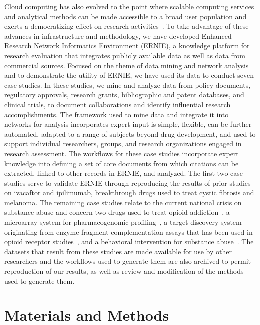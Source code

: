 \documentclass[review]{elsarticle}
\begin{document}
Cloud computing has also evolved to the point where scalable computing services and analytical methods can be made accessible to a broad user population and exerts a democratizing effect on research activities~\cite{Barga2011}. To take advantage of these advances in infrastructure and methodology, we have developed Enhanced Research Network Informatics Environment (ERNIE), a knowledge platform for research evaluation that integrates publicly available data as well as data from commercial sources. Focused on the theme of data mining and network analysis and to demonstrate the utility of ERNIE, we have used its data to conduct seven case studies. In these studies, we mine and analyze data from policy documents, regulatory approvals, research grants, bibliographic and patent databases, and clinical trials, to document collaborations and identify influential research accomplishments. The framework used to mine data and integrate it into networks for analysis incorporates expert input is simple, flexible, can be further automated, adapted to a range of subjects beyond drug development, and used to support individual researchers, groups, and research organizations engaged in research assessment. The workflows for these case studies incorporate expert knowledge into defining a set of core documents from which citations can be extracted, linked to other records in ERNIE, and analyzed. The first two case studies serve to validate ERNIE through reproducing the results of prior studies~\cite{Williams2015} on ivacaftor and ipilimumab, breakthrough drugs used to treat cystic fibrosis and melanoma. The remaining case studies relate to the current national crisis on substance abuse and concern two drugs used to treat opioid addiction~\cite{Blumberg1973, Cowan1977}, a microarray system for pharmacogenomic profiling~\cite{deLeon2006}, a target discovery system originating from enzyme fragment complementation assays that has been used in opioid receptor studies~\cite{Khanna1989}, and a behavioral intervention for substance abuse~\cite{Botvin1980}. The datasets that result from these studies are made available for use by other researchers and the workflows used to generate them are also archived to permit reproduction of our results, as well as review and modification of the methods used to generate them.

\section*{Materials and Methods}
\end{document}
